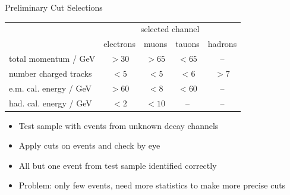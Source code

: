 \documentclass[11pt,xcolor=dvipsnames,professionalfonts]{beamer}
\begin{document}
\begin{frame}{Preliminary Cut Selections}
	\begin{center}
		\begin{tabular}{lcccc}
			\toprule
			&\multicolumn{4}{c}{selected channel}  \\ \cmidrule(r){2-5}
			& electrons & muons & tauons & hadrons \\
			\midrule
			total momentum / \si{GeV} & $> 30$ & $> 65$ & $< 65$ & --\\
			number charged tracks & $< 5$  & $< 5$  & $< 6$ & $>7$ \\
			e.m. cal. energy / \si{GeV}  & $> 60$ & $< 8$ & $< 60$ & -- \\
			had. cal. energy / \si{GeV}  & $< 2$  & $< 10$ & -- & -- \\
			\bottomrule
		\end{tabular}
	\end{center}
	\begin{itemize}
		\item Test sample with events from unknown decay channels
		\item Apply cuts on events and check by eye
		\item All but one event from test sample identified correctly
		\item Problem: only few events, need more statistics to make more precise cuts
	\end{itemize}
\end{frame}
\end{document}
